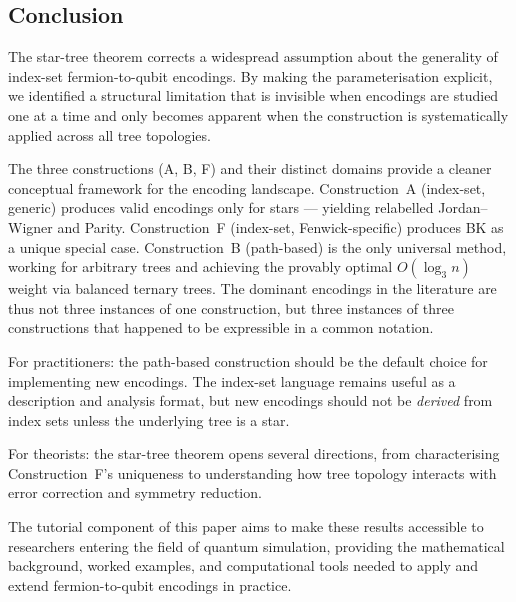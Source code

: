 \subsection{Conclusion}

The star-tree theorem corrects a widespread assumption about the
generality of index-set fermion-to-qubit encodings.  By making the
parameterisation explicit, we identified a structural limitation that
is invisible when encodings are studied one at a time and only
becomes apparent when the construction is systematically applied
across all tree topologies.

The three constructions (A, B, F) and their distinct domains provide a
cleaner conceptual framework for the encoding landscape.  Construction~A
(index-set, generic) produces valid encodings only for stars ---
yielding relabelled Jordan--Wigner and Parity.  Construction~F
(index-set, Fenwick-specific) produces BK as a unique special case.
Construction~B (path-based) is the only universal method, working for
arbitrary trees and achieving the provably optimal $O(\log_3 n)$ weight
via balanced ternary trees.  The dominant encodings in the literature
are thus not three instances of one construction, but three instances
of three constructions that happened to be expressible in a common
notation.

For practitioners: the path-based construction should be the default
choice for implementing new encodings.  The index-set language
remains useful as a description and analysis format, but new encodings
should not be \emph{derived} from index sets unless the underlying
tree is a star.

For theorists: the star-tree theorem opens several directions, from
characterising Construction~F's uniqueness to understanding how tree
topology interacts with error correction and symmetry reduction.

The tutorial component of this paper aims to make these results
accessible to researchers entering the field of quantum simulation,
providing the mathematical background, worked examples, and
computational tools needed to apply and extend fermion-to-qubit
encodings in practice.
